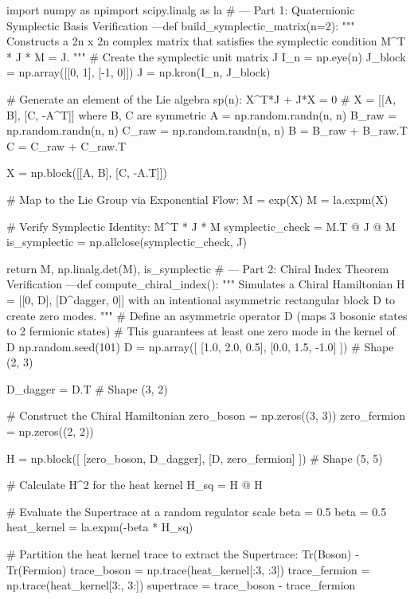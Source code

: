 import numpy as npimport scipy.linalg as la
# --- Part 1: Quaternionic Symplectic Basis Verification ---def build_symplectic_matrix(n=2):
    """
    Constructs a 2n x 2n complex matrix that satisfies the 
    symplectic condition M^T * J * M = J.
    """
    # Create the symplectic unit matrix J
    I_n = np.eye(n)
    J_block = np.array([[0, 1], [-1, 0]])
    J = np.kron(I_n, J_block)
    
    # Generate an element of the Lie algebra sp(n): X^T*J + J*X = 0
    # X = [[A, B], [C, -A^T]] where B, C are symmetric
    A = np.random.randn(n, n)
    B_raw = np.random.randn(n, n)
    C_raw = np.random.randn(n, n)
    B = B_raw + B_raw.T
    C = C_raw + C_raw.T
    
    X = np.block([[A, B], [C, -A.T]])
    
    # Map to the Lie Group via Exponential Flow: M = exp(X)
    M = la.expm(X)
    
    # Verify Symplectic Identity: M^T * J * M
    symplectic_check = M.T @ J @ M
    is_symplectic = np.allclose(symplectic_check, J)
    
    return M, np.linalg.det(M), is_symplectic
# --- Part 2: Chiral Index Theorem Verification ---def compute_chiral_index():
    """
    Simulates a Chiral Hamiltonian H = [[0, D], [D^dagger, 0]] 
    with an intentional asymmetric rectangular block D to create zero modes.
    """
    # Define an asymmetric operator D (maps 3 bosonic states to 2 fermionic states)
    # This guarantees at least one zero mode in the kernel of D
    np.random.seed(101)
    D = np.array([
        [1.0, 2.0, 0.5],
        [0.0, 1.5, -1.0]
    ]) # Shape (2, 3)
    
    D_dagger = D.T # Shape (3, 2)
    
    # Construct the Chiral Hamiltonian
    zero_boson = np.zeros((3, 3))
    zero_fermion = np.zeros((2, 2))
    
    H = np.block([
        [zero_boson, D_dagger],
        [D, zero_fermion]
    ]) # Shape (5, 5)
    
    # Calculate H^2 for the heat kernel
    H_sq = H @ H
    
    # Evaluate the Supertrace at a random regulator scale beta = 0.5
    beta = 0.5
    heat_kernel = la.expm(-beta * H_sq)
    
    # Partition the heat kernel trace to extract the Supertrace: Tr(Boson) - Tr(Fermion)
    trace_boson = np.trace(heat_kernel[:3, :3])
    trace_fermion = np.trace(heat_kernel[3:, 3:])
    supertrace = trace_boson - trace_fermion
    
